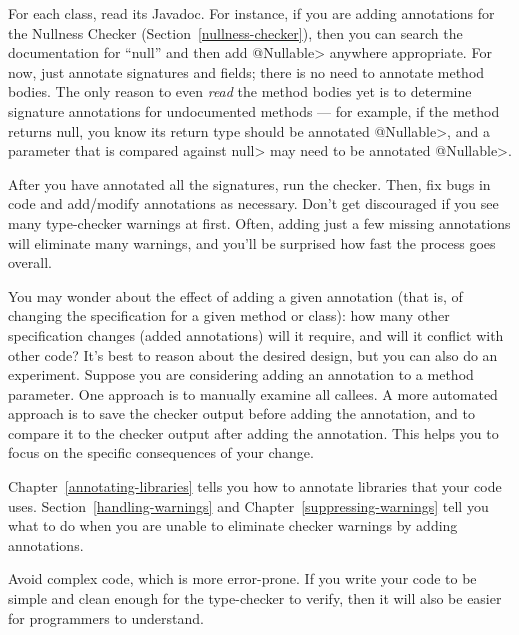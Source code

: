 For each class, read its Javadoc.  For instance, if you are adding
annotations for the Nullness Checker (Section~\ref{nullness-checker}), then
you can search the documentation for ``null'' and then add \<@Nullable>
anywhere appropriate.  For now, just annotate signatures and fields; there is no
need to annotate method bodies.  The only reason to even
\emph{read} the method bodies yet is to determine signature annotations for
undocumented methods ---
for example, if the method returns null, you know its return type should be
annotated \<@Nullable>, and a parameter that is compared against \<null>
may need to be annotated \<@Nullable>.

After you have annotated all the signatures, run the checker.
Then, fix bugs in code and add/modify annotations as necessary.
Don't get discouraged if you see many type-checker warnings at first.
Often, adding just a few missing annotations will eliminate many warnings,
and you'll be surprised how fast the process goes overall.

You may wonder about the effect of adding a given annotation (that is, of
changing the specification for a given method or class):  how many
other specification changes (added annotations) will it require, and will
it conflict with other code?  It's best to reason about the desired design,
but you can also do an experiment.
Suppose you are considering adding an annotation to a method parameter.
One approach is to manually examine all callees.
A more automated approach is to save the checker
output before adding the annotation, and to compare it to the checker
output after adding the annotation.  This helps you to focus on the
specific consequences of your change.

Chapter~\ref{annotating-libraries} tells you how to annotate libraries that
your code uses.  Section~\ref{handling-warnings} and
Chapter~\ref{suppressing-warnings} tell you what to do when you are unable
to eliminate checker warnings by adding annotations.



Avoid complex code, which is more error-prone.  If you write your code to
be simple and clean enough for the type-checker to verify, then it will
also be easier for programmers to understand.

